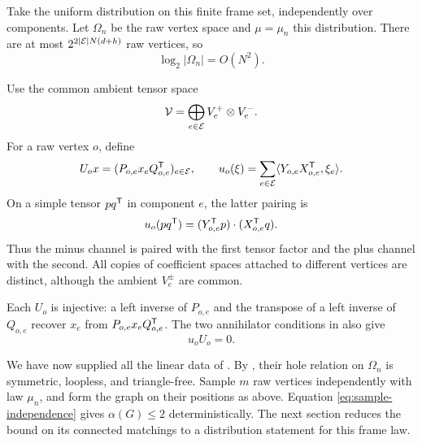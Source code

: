 Take the uniform distribution on this finite frame set, independently over components.
Let \(\Omega_n\) be the raw vertex space and \(\mu=\mu_n\) this distribution.
There are at most \(2^{2|\mathcal E|N(d+h)}\) raw vertices, so
\begin{equation}\label{eq:raw-space-size}
 \log_2|\Omega_n|=O(N^2).
\end{equation}

Use the common ambient tensor space
\[
 \mathcal V=\bigoplus_{e\in\mathcal E}V_e^+\otimes V_e^-.
\]
For a raw vertex \(o\), define
\begin{equation}\label{eq:raw-embedding}
 U_o x=(P_{o,e}x_eQ_{o,e}^{\mathsf T})_{e\in\mathcal E},
 \qquad
 u_o(\xi)=\sum_{e\in\mathcal E}\langle Y_{o,e}X_{o,e}^{\mathsf T},\xi_e\rangle.
\end{equation}
On a simple tensor \(pq^{\mathsf T}\) in component \(e\), the latter pairing is
\[
 u_o(pq^{\mathsf T})=(Y_{o,e}^{\mathsf T} p)\cdot(X_{o,e}^{\mathsf T} q).
\]
Thus the minus channel is paired with the first tensor factor and the plus channel with the second.
All copies of coefficient spaces attached to different vertices are distinct, although the ambient \(V_e^\pm\) are common.

Each \(U_o\) is injective: a left inverse of \(P_{o,e}\) and the transpose of a left inverse of \(Q_{o,e}\) recover \(x_e\) from \(P_{o,e}x_eQ_{o,e}^{\mathsf T}\).
The two annihilator conditions in  also give
\begin{equation}\label{eq:self-contraction-zero}
 u_oU_o=0.
\end{equation}

We have now supplied all the linear data of .
By , their hole relation on
\(\Omega_n\) is symmetric, loopless, and triangle-free.
Sample \(m\) raw vertices independently with law \(\mu_n\), and
form the graph on their positions as above. Equation
\eqref{eq:sample-independence} gives \(\alpha(G)\le2\)
deterministically. The next section reduces the bound on its
connected matchings to a distribution statement for this frame law.
